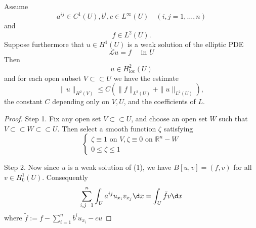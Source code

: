 \begin{theorem}
    \label{thm: Interior H^2-regularity}
    Assume
    \begin{equation*}
        a^{i j} \in C^1(U), b^i, c \in L^{\infty}(U) \quad(i, j=1, \ldots, n)
    \end{equation*}
    and
    \begin{equation*}
        f \in L^2(U) .
    \end{equation*}
    Suppose furthermore that $u \in H^1(U)$ is a weak solution of the elliptic PDE
    \begin{equation}
        \mathcal{L}u=f \quad \text { in } U
    \end{equation}
    Then
    \begin{equation*}
        u \in H_{\mathrm{loc}}^2(U)
    \end{equation*}
    and for each open subset $V \subset \subset U$ we have the estimate
    \begin{equation*}
        \|u\|_{H^2(V)} \leq C\left(\|f\|_{L^2(U)}+\|u\|_{L^2(U)}\right),
    \end{equation*}
    the constant $C$ depending only on $V, U$, and the coefficients of $L$.
    \begin{proof}
        Step 1.
        Fix any open set $V \subset \subset U$, and choose an open set $W$ such that $V \subset \subset W \subset \subset U$. Then select a smooth function $\zeta$ satisfying
        \begin{equation*}
            \left\{
            \begin{array}{l}
                \zeta \equiv 1 \text { on } V, \zeta \equiv 0 \text { on } \mathbb{R}^n-W \\
                0 \leq \zeta \leq 1
            \end{array}
            \right.
        \end{equation*}

        Step 2.
        Now since $u$ is a weak solution of (1), we have $B[u, v]=(f, v)$ for all $v \in H_0^1(U)$. Consequently
        \begin{equation*}
            \sum_{i, j=1}^n \int_U a^{i j} u_{x_i} v_{x_j} \d x=\int_U \tilde{f} v \d x
        \end{equation*}
        where $\tilde{f}:=f-\sum_{i=1}^n b^i u_{x_i}-c u$



\end{proof}
\end{theorem}
